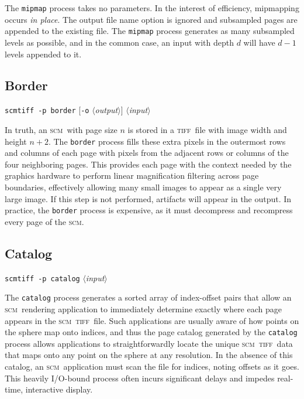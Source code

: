 \documentclass[oneside,11pt]{memoir}
\newcommand{\scm}     {\textsc{scm}}
\newcommand{\tiff}    {\textsc{tiff}}
\newcommand{\scmtiff} {\texttt{scmtiff}}
\newcommand{\inangles}[1]{$\langle$#1$\rangle$}
\begin{document}
\begin{Spacing}{1.1}
The \texttt{mipmap} process takes no parameters. In the interest of efficiency, mipmapping occurs \textit{in place}. The output file name option is ignored and subsampled pages are appended to the existing file. The \texttt{mipmap} process generates as many subsampled levels as possible, and in the common case, an input with depth $d$ will have $d-1$ levels appended to it.

\subsection{Border}

\noindent\scmtiff\ \texttt{-p border} [\texttt{-o} \inangles{\textit{output}}] \inangles{\textit{input}}

\bigskip In truth, an \scm\ with page size $n$ is stored in a \tiff\ file with image width and height $n+2$. The \texttt{border} process fills these extra pixels in the outermost rows and columns of each page with pixels from the adjacent rows or columns of the four neighboring pages. This provides each page with the context needed by the graphics hardware to perform linear magnification filtering across page boundaries, effectively allowing many small images to appear as a single very large image. If this step is not performed, artifacts will appear in the output. In practice, the \texttt{border} process is expensive, as it must decompress and recompress every page of the \scm.

\subsection{Catalog}

\noindent\scmtiff\ \texttt{-p catalog} \inangles{\textit{input}}

\bigskip The \texttt{catalog} process generates a sorted array of index-offset pairs that allow an \scm\ rendering application to immediately determine exactly where each page appears in the \scm\ \tiff\ file. Such applications are usually aware of how points on the sphere map onto indices, and thus the page catalog generated by the \texttt{catalog} process allows applications to straightforwardly locate the unique \scm\ \tiff\ data that maps onto any point on the sphere at any resolution. In the absence of this catalog, an \scm\ application must scan the file for indices, noting offsets as it goes. This heavily I/O-bound process often incurs significant delays and impedes real-time, interactive display.


\end{Spacing}
\end{document}

